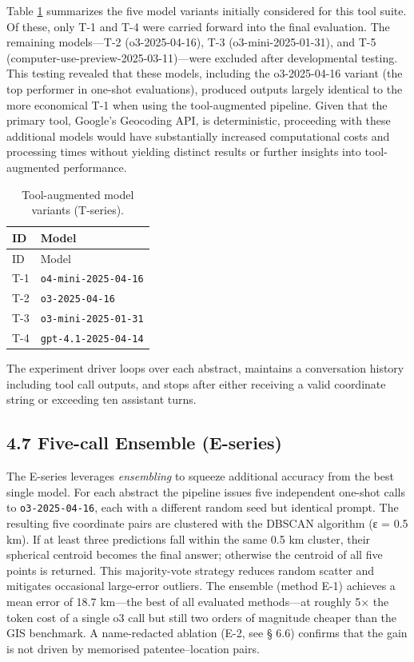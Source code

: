 Table \ref{tbl:tmodels} summarizes the five model variants initially
considered for this tool suite. Of these, only T-1 and T-4 were carried
forward into the final evaluation. The remaining models---T-2
(o3-2025-04-16), T-3 (o3-mini-2025-01-31), and T-5
(computer-use-preview-2025-03-11)---were excluded after developmental
testing. This testing revealed that these models, including the
o3-2025-04-16 variant (the top performer in one-shot evaluations),
produced outputs largely identical to the more economical T-1 when using
the tool-augmented pipeline. Given that the primary tool, Google's
Geocoding API, is deterministic, proceeding with these additional models
would have substantially increased computational costs and processing
times without yielding distinct results or further insights into
tool-augmented performance.

\begin{longtable}[]{@{}ll@{}}
\caption{\label{tbl:tmodels}Tool-augmented model variants
(T-series).}\tabularnewline
\toprule\noalign{}
ID & Model \\
\midrule\noalign{}
\endfirsthead
\toprule\noalign{}
ID & Model \\
\midrule\noalign{}
\endhead
\bottomrule\noalign{}
\endlastfoot
T-1 & \passthrough{\lstinline!o4-mini-2025-04-16!} \\
T-2 & \passthrough{\lstinline!o3-2025-04-16!} \\
T-3 & \passthrough{\lstinline!o3-mini-2025-01-31!} \\
T-4 & \passthrough{\lstinline!gpt-4.1-2025-04-14!} \\
\end{longtable}

The experiment driver loops over each abstract, maintains a conversation
history including tool call outputs, and stops after either receiving a
valid coordinate string or exceeding ten assistant turns.

\subsection{4.7 Five-call Ensemble
(E-series)}\label{five-call-ensemble-e-series}

The E-series leverages \emph{ensembling} to squeeze additional accuracy
from the best single model. For each abstract the pipeline issues five
independent one-shot calls to \passthrough{\lstinline!o3-2025-04-16!},
each with a different random seed but identical prompt. The resulting
five coordinate pairs are clustered with the DBSCAN algorithm (ε = 0.5
km). If at least three predictions fall within the same 0.5 km cluster,
their spherical centroid becomes the final answer; otherwise the
centroid of all five points is returned. This majority-vote strategy
reduces random scatter and mitigates occasional large-error outliers.
The ensemble (method E-1) achieves a mean error of 18.7 km---the best of
all evaluated methods---at roughly 5× the token cost of a single o3 call
but still two orders of magnitude cheaper than the GIS benchmark. A
name-redacted ablation (E-2, see § 6.6) confirms that the gain is not
driven by memorised patentee--location pairs.

